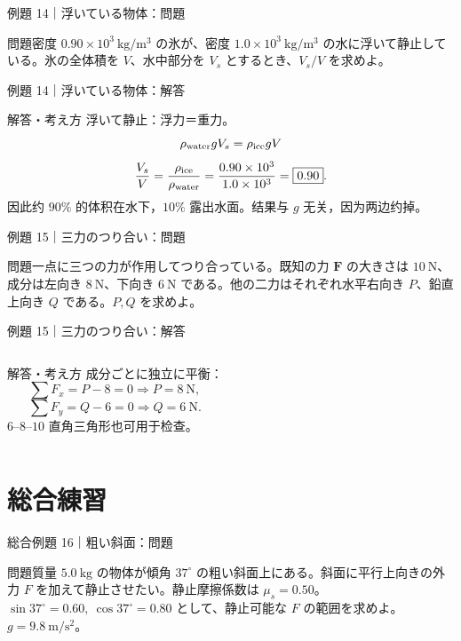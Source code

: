 \documentclass[notheorems,aspectratio=169]{beamer}
\newcommand{\qcard}[1]{%
  \begin{block}{問題}\centering\large #1\end{block}}
\newcommand{\acard}[1]{%
  \begin{exampleblock}{解答・考え方}#1\end{exampleblock}}
\newcommand{\forcearrow}[5]{%
  \draw[-{Latex[length=3mm]},very thick,#5] (#1,#2)--++(#3,#4);}
\begin{document}
\begin{frame}{例題 14｜浮いている物体：問題}
\vfill
\qcard{密度 $0.90\times10^3\ \mathrm{kg/m^3}$ の氷が、密度 $1.0\times10^3\ \mathrm{kg/m^3}$ の水に浮いて静止している。氷の全体積を $V$、水中部分を $V_s$ とするとき、$V_s/V$ を求めよ。}
\vfill
\end{frame}

\begin{frame}{例題 14｜浮いている物体：解答}
\acard{
浮いて静止：浮力＝重力。
\[
\rho_{\rm water}gV_s=\rho_{\rm ice}gV
\]
\[
\frac{V_s}{V}=\frac{\rho_{\rm ice}}{\rho_{\rm water}}
=\frac{0.90\times10^3}{1.0\times10^3}=\boxed{0.90}.
\]
因此约 $90\%$ 的体积在水下，$10\%$ 露出水面。结果与 $g$ 无关，因为两边约掉。}
\end{frame}

\begin{frame}{例題 15｜三力のつり合い：問題}
\vfill
\qcard{一点に三つの力が作用してつり合っている。既知の力 $\bm F$ の大きさは $10\ \mathrm N$、成分は左向き $8\ \mathrm N$、下向き $6\ \mathrm N$ である。他の二力はそれぞれ水平右向き $P$、鉛直上向き $Q$ である。$P,Q$ を求めよ。}
\vfill
\end{frame}

\begin{frame}{例題 15｜三力のつり合い：解答}
\begin{columns}[c]
\centering
{}
\acard{
成分ごとに独立に平衡：
\[
\sum F_x=P-8=0\Rightarrow\boxed{P=8\ \mathrm N},
\]
\[
\sum F_y=Q-6=0\Rightarrow\boxed{Q=6\ \mathrm N}.
\]
$6$--$8$--$10$ 直角三角形也可用于检查。}
\end{columns}
\end{frame}

\section{総合練習}

\begin{frame}{総合例題 16｜粗い斜面：問題}
\small
\vfill
\qcard{質量 $5.0\ \mathrm{kg}$ の物体が傾角 $37^\circ$ の粗い斜面上にある。斜面に平行上向きの外力 $F$ を加えて静止させたい。静止摩擦係数は $\mu_s=0.50$。$\sin37^\circ=0.60,\ \cos37^\circ=0.80$ として、静止可能な $F$ の範囲を求めよ。$g=9.8\ \mathrm{m/s^2}$。}
\vfill
\end{frame}
\end{document}
